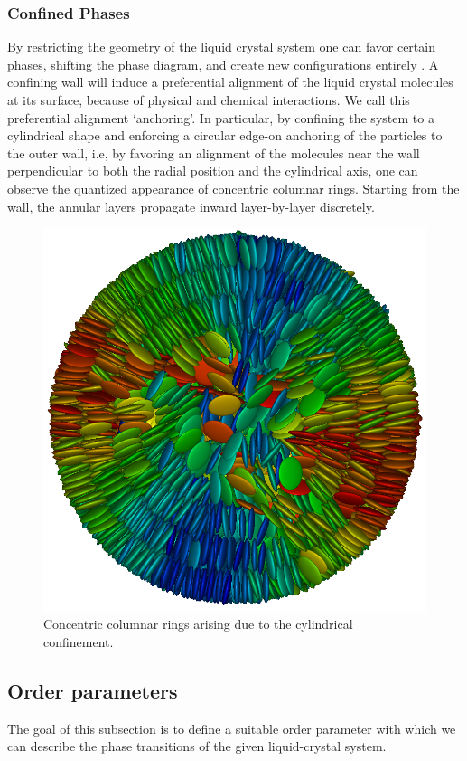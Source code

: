 \subsubsection{Confined Phases}
\label{subsubsec:confinedphases}
By restricting the geometry of the liquid crystal system one can favor certain phases, shifting the phase diagram, and create new configurations entirely \cite{zhang2015columnar,sentker2018quantized}.
A confining wall will induce a preferential alignment of the liquid crystal molecules at its surface, because of physical and chemical interactions. We call this preferential alignment `anchoring'.
In particular, by confining the system to a cylindrical shape and enforcing a circular edge-on anchoring of the particles to the outer wall, i.e, by favoring an alignment of the molecules near the wall perpendicular to both the radial position and the cylindrical axis, one can observe the quantized appearance of concentric columnar rings. Starting from the wall, the annular layers propagate inward layer-by-layer discretely. 
\begin{figure}[H]
 \centering
 \includegraphics[width=.3\linewidth]{images/confined.png}
 \caption{Concentric columnar rings arising due to the cylindrical confinement. \cite{sentker2018quantized}}
 \label{fig:pore}
\end{figure}


\subsection{Order parameters}
\label{subsec:orderparameters}
The goal of this subsection is to define a suitable order parameter with which we can describe the phase transitions of the given liquid-crystal system.

